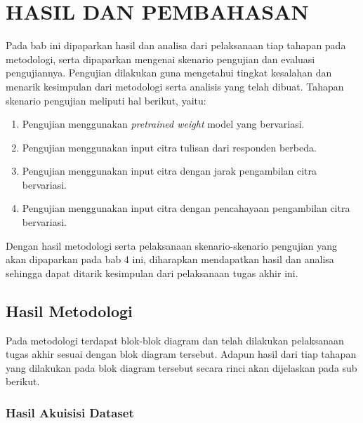 \chapter{HASIL DAN PEMBAHASAN}
\label{chap:hasilpembahasan}


Pada bab ini dipaparkan hasil dan analisa dari pelaksanaan tiap tahapan pada metodologi, serta dipaparkan mengenai skenario pengujian dan evaluasi pengujiannya. Pengujian dilakukan guna mengetahui tingkat kesalahan dan menarik kesimpulan dari metodologi serta analisis yang telah dibuat. Tahapan skenario pengujian meliputi hal berikut, yaitu: \par

\begin{enumerate}[nolistsep]
  \item Pengujian menggunakan \textit{pretrained weight} model yang bervariasi.
  \item Pengujian menggunakan input citra tulisan dari responden berbeda.
  \item Pengujian menggunakan input citra dengan jarak pengambilan citra bervariasi.
  \item Pengujian menggunakan input citra dengan pencahayaan pengambilan citra bervariasi.
\end{enumerate}

Dengan hasil metodologi serta pelaksanaan skenario-skenario pengujian yang akan dipaparkan pada bab 4 ini, diharapkan mendapatkan hasil dan analisa sehingga dapat ditarik kesimpulan dari pelaksanaan tugas akhir ini. \par

\section{Hasil Metodologi}
\label{sec:hasilmetodologi}

Pada metodologi terdapat blok-blok diagram dan telah dilakukan pelaksanaan tugas akhir sesuai dengan blok diagram tersebut. Adapun hasil dari tiap tahapan yang dilakukan pada blok diagram tersebut secara rinci akan dijelaskan pada sub berikut. \par

\subsection{Hasil Akuisisi Dataset}
\label{subsec:Hasilakuisisidataset}

